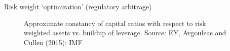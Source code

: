 \begin{frame}{Risk weight `optimization' (regulatory arbitrage)}

\begin{figure}
\begin{center}


\caption{\label{fig:L4_ey_ta_rwa_note} Approximate constancy of capital ratios with respect to risk weighted assets vs. buildup of leverage. Source: EY, Avgouleas and Cullen (2015); IMF}

\end{center}
\end{figure}


\end{frame}
